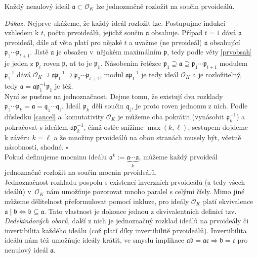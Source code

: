 \documentclass [12pt]{report}
\begin{document}
\begin{veta}
Každý nenulový ideál $\mathfrak{a} \subset \mathcal{O}_K$ lze jednoznačně rozložit na součin prvoideálů.
\end{veta}
\noindent \textit{Důkaz.} Nejprve ukážeme, že každý ideál rozložit lze. Postupujme indukcí vzhledem k $t$, počtu prvoideálů, jejichž součin $\mathfrak{a}$ obsahuje. Případ $t=1$ dává $\mathfrak{a}$ prvoideál, dále ať věta platí pro nějaké $t$ a uvažme (ne prvoideál) $\mathfrak{a}$ obsahující $\mathfrak{p}_1 \cdots \mathfrak{p}_{t+1}$. Jistě $\mathfrak{a}$ je obsažen v~nějakém maximálním $\mathfrak{p}$, tedy podle věty \ref{prvobsah} je jeden z $\mathfrak{p}_i$ roven $\mathfrak{p}$, ať to je $\mathfrak{p}_1$. Násobením řetězce $\mathfrak{p}_1 \supseteq \mathfrak{a} \supseteq \mathfrak{p}_1 \cdots \mathfrak{p}_{t+1}$ modulem $\mathfrak{p}_1^{-1}$ dává $\mathcal{O}_K \supseteq \mathfrak{a} \mathfrak{p}_1^{-1} \supseteq \mathfrak{p}_2 \cdots \mathfrak{p}_{t+1}$, modul $\mathfrak{a} \mathfrak{p}_1^{-1}$ je tedy ideál $\mathcal{O}_K$ a je rozložitelný, tedy $\mathfrak{a} = \mathfrak{a} \mathfrak{p}_1^{-1} \mathfrak{p}_1$ je též.\\

Nyní se pusťme na jednoznačnost. Dejme tomu, že existují dva rozklady $\mathfrak{p}_1 \cdots \mathfrak{p}_k = \mathfrak{a} = \mathfrak{q}_1 \cdots \mathfrak{q}_{\ell}$. Ideál $\mathfrak{p}_k$ dělí součin $\mathfrak{q}_i$, je proto roven jednomu z nich. Podle důsledku \ref{cancel} a~komutativity $\mathcal{O}_K$ je můžeme oba pokrátit (vynásobit $\mathfrak{p}_k^{-1}$) a pokračovat s ideálem $\mathfrak{a} \mathfrak{p}_k^{-1}$, čímž ostře snížíme $\max (k,\ell)$, sestupem dojdeme k závěru $k = \ell$ a že množiny prvoideálů na obou stranách musely být, včetně násobnosti, shodné. \hfill $\square$\\

Pokud definujeme mocninu ideálu $\mathfrak{a}^k := \underbrace{\mathfrak{a} \cdots \mathfrak{a}}_{k}$, můžeme každý prvoideál jednoznačně rozložit na součin mocnin prvoideálů.\\

Jednoznačnost rozkladu pospolu s existencí inverzních prvoideálů (a tedy všech ideálů) v~$\mathcal{O}_K$ nám umožňuje pozorovat mnoho paralel s celými čísly. Mimo jiné můžeme dělitelnost přeformulovat pomocí inkluze, pro ideály $\mathcal{O}_K$ platí ekvivalence $\mathfrak{a} \mid \mathfrak{b} \Leftrightarrow \mathfrak{b} \subseteq \mathfrak{a}$. Tato vlastnost je dokonce jednou z ekvivalentních definicí tzv. \textit{Dedekindových oborů}, další z nich je jednoznačný rozklad ideálů na prvoideály či invertibilita každého ideálu (což platí díky invertibilitě prvoideálů). Invertibilita ideálů nám též umožňuje ideály krátit, ve smyslu implikace $\mathfrak{a b} =\mathfrak{ac} \Rightarrow \mathfrak{b} = \mathfrak{c}$ pro nenulový ideál $\mathfrak{a}$.\\
\end{document}
